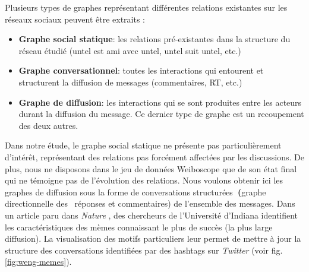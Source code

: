 Plusieurs types de graphes représentant différentes relations existantes sur les réseaux sociaux peuvent \^etre extraits :

\begin{itemize}
    \item \textbf{Graphe social statique}: les relations pré-existantes dans la structure du réseau étudié (untel est ami avec untel, untel suit untel, etc.)
    \item \textbf{Graphe conversationnel}: toutes les interactions qui entourent et structurent la diffusion de messages (commentaires, RT, etc.)
    \item \textbf{Graphe de diffusion}: les interactions qui se sont produites entre les acteurs durant la diffusion du message. Ce dernier type de graphe est un recoupement des deux autres.
\end{itemize}




Dans notre étude, le graphe social statique ne présente pas particulièrement d{\textquoteright}intér\^et, représentant des relations pas forcément affectées par les discussions. De plus, nous ne disposons dans le jeu de données Weiboscope que de son état final qui ne témoigne pas de l{\textquoteright}évolution des relations. Nous voulons obtenir ici les graphes de diffusion sous la forme de conversations structurées\textbf{~(}graphe directionnelle des \ réponses et commentaires) de l{\textquoteright}ensemble des messages. Dans un article paru dans \textit{Nature} \citep{Weng2012}, des chercheurs de l{\textquoteright}Université d{\textquoteright}Indiana identifient les caractéristiques des mèmes connaissant le plus de succès (la plus large diffusion). La visualisation des motifs particuliers leur permet de mettre à jour la structure des conversations identifiées par des hashtags sur \textit{Twitter} (voir fig. \ref{fig:weng-memes}).


